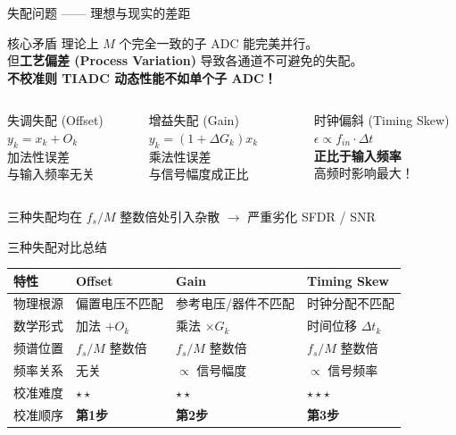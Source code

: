 \documentclass[table,UTF8,11pt,aspectratio=169]{beamer}
\begin{document}
\begin{frame}{失配问题 —— 理想与现实的差距}
\begin{alertblock}{核心矛盾}
理论上 $M$ 个完全一致的子 ADC 能完美并行。\\
但\textbf{工艺偏差 (Process Variation)} 导致各通道不可避免的失配。\\
\textbf{不校准则 TIADC 动态性能不如单个子 ADC！}
\end{alertblock}

\vspace{0.3cm}
\begin{columns}[T]
\begin{block}{失调失配 (Offset)}
$y_k = x_k + O_k$\\
加法性误差\\
与输入频率无关
\end{block}

\begin{block}{增益失配 (Gain)}
$y_k = (1+\Delta G_k) x_k$\\
乘法性误差\\
与信号幅度成正比
\end{block}

\begin{block}{时钟偏斜 (Timing Skew)}
$\epsilon \propto f_{in} \cdot \Delta t$\\
\textbf{正比于输入频率}\\
高频时影响最大！
\end{block}
\end{columns}

\vspace{0.3cm}
\centering
三种失配均在 $f_s/M$ 整数倍处引入杂散 $\rightarrow$ 严重劣化 SFDR / SNR
\end{frame}

\begin{frame}{三种失配对比总结}
\begin{table}
\begin{tabular}{p{1.8cm}p{2.5cm}p{2.5cm}p{2.5cm}}
\toprule
\textbf{特性} & \textbf{Offset} & \textbf{Gain} & \textbf{Timing Skew} \\
\midrule
物理根源 & 偏置电压不匹配 & 参考电压/器件不匹配 & 时钟分配不匹配 \\
数学形式 & 加法 $+O_k$ & 乘法 $\times G_k$ & 时间位移 $\Delta t_k$ \\
频谱位置 & $f_s/M$ 整数倍 & $f_s/M$ 整数倍 & $f_s/M$ 整数倍 \\
频率关系 & 无关 & $\propto$ 信号幅度 & $\propto$ 信号频率 \\
校准难度 & $\star\star$ & $\star\star$ & $\star\star\star$ \\
校准顺序 & \textbf{第1步} & \textbf{第2步} & \textbf{第3步} \\
\bottomrule
\end{tabular}
\end{table}
\end{frame}
\end{document}
